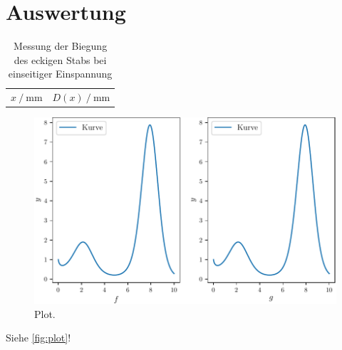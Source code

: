 \section{Auswertung}
\label{sec:Auswertung}

\begin{table}
  \centering
  \caption{Messung der Biegung des eckigen Stabs bei einseitiger Einspannung}
  \label{tab:ecks}
  \begin{tabular}{S[table-format=4.0] S[table-format=4.0]}
    \toprule
    {$x \mathbin{/} \si{\milli\meter}$} & {$D(x) \mathbin{/} \si{\milli\meter}$}
  \end{tabular}
\end{table}

\begin{figure}
  \centering
  \includegraphics{plot.pdf}
  \caption{Plot.}
  \label{fig:plot}
\end{figure}


Siehe \autoref{fig:plot}!
